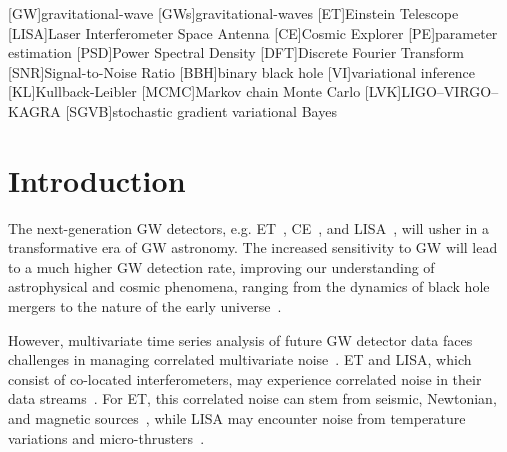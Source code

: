 \documentclass[%
 reprint,
 amsmath,amssymb,
 aps,
 nofootinbib,
]{revtex4-2}
\begin{document}
\maketitle


\begin{acronym}
    [GW]{gravitational-wave}
    [GWs]{gravitational-waves}
    [ET]{Einstein Telescope}
    [LISA]{Laser Interferometer Space Antenna}
    [CE]{Cosmic Explorer}
    [PE]{parameter estimation}
    [PSD]{Power Spectral Density}
    [DFT]{Discrete Fourier Transform}
    [SNR]{Signal-to-Noise Ratio}
    [BBH]{binary black hole}
    [VI]{variational inference}
    [KL]{Kullback-Leibler}
    [MCMC]{Markov chain Monte Carlo}
    [LVK]{LIGO--VIRGO--KAGRA}
    [SGVB]{stochastic gradient variational Bayes}
\end{acronym}


\section{Introduction}

The next-generation \ac{GW} detectors, e.g. \ac{ET}~\cite{Punturo_2010}, \ac{CE}~\cite{CE_horizon_study}, and \ac{LISA}~\cite{LISA_science_case}, will usher in a transformative era of \ac{GW} astronomy. 
The increased sensitivity to \ac{GW} will lead to a much higher \ac{GW} detection rate, improving our understanding of astrophysical and cosmic phenomena, ranging from the dynamics of black hole mergers to the nature of the early universe~\cite{ET_science_case, Maggiore_2020_ET_science_case, Branchesi_2023_ET_science_case, CE_horizon_study, LISA_science_case}.

However, multivariate time series analysis of future GW detector data faces challenges in managing correlated multivariate noise~\cite{ET_design_report,LISA_red_book}.
\ac{ET} and \ac{LISA}, which consist of co-located interferometers, may experience correlated noise in their data streams~\cite{Janssens2023}. 
For \ac{ET}, this correlated noise can stem from seismic, Newtonian, and magnetic sources~\cite{Janssens_newtonian_seismic, PhysRevD.109.102002,Ball_lightning_strokes, Janssens_magnetic_noise}, while \ac{LISA}  may encounter noise from temperature variations and micro-thrusters~\cite{lisa_temp_noise,lisa_thrusters_noise}.
\end{document}
